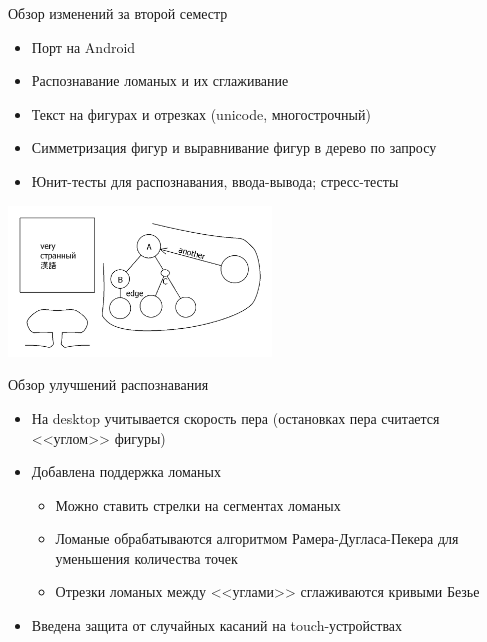 \documentclass[utf8,xcolor=table]{beamer}
\begin{document}
\begin{frame}[t]{Обзор изменений за второй семестр}
  \begin{itemize}
  \item Порт на Android
  \item Распознавание ломаных и их сглаживание
  \item Текст на фигурах и отрезках (unicode, многострочный)
  \item Симметризация фигур и выравнивание фигур в дерево по запросу
  \item Юнит-тесты для распознавания, ввода-вывода; стресс-тесты
  \end{itemize}
  \begin{center}
    \includegraphics[height=4cm]{demo}
  \end{center}
\end{frame}

\begin{frame}[t]{Обзор улучшений распознавания}
  \begin{itemize}
  \item На desktop учитывается скорость пера (остановках пера считается <<углом>> фигуры)
  \item Добавлена поддержка ломаных
    \begin{itemize}
      \item Можно ставить стрелки на сегментах ломаных
      \item Ломаные обрабатываются алгоритмом Рамера-Дугласа-Пекера для уменьшения количества точек
      \item Отрезки ломаных между <<углами>> сглаживаются кривыми Безье
    \end{itemize}
  \item Введена защита от случайных касаний на touch-устройствах
  \end{itemize}
\end{frame}
\end{document}
